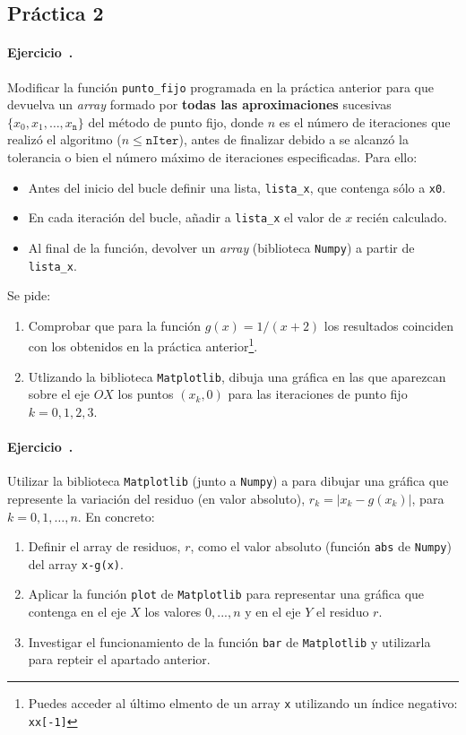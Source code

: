 \documentclass[11pt]{article}
\newcommand{\practica}[1]{\subsection*{#1}}
\newcounter{ejercicio}
\newcommand{\ejercicio}{\stepcounter{ejercicio}\paragraph*{Ejercicio~\theejercicio.}}
\begin{document}
\practica{Práctica 2}


\ejercicio
Modificar la función \verb|punto_fijo| programada en la práctica anterior para que devuelva un \textit{array} formado por \textbf{todas las aproximaciones} sucesivas $\{x_0,x_1,\dots,x_{\texttt{n}}\}$ del método de punto fijo, donde $n$ es el número de iteraciones que realizó el algoritmo ($n\le\texttt{nIter}$), antes de finalizar debido a se alcanzó la tolerancia o bien el número máximo de iteraciones especificadas. Para ello:
\begin{itemize}
  \item Antes del inicio del bucle definir una lista, \texttt{lista\_x}, que contenga sólo a \texttt{x0}.
  \item En cada iteración del bucle, añadir a \texttt{lista\_x} el valor de $x$ recién calculado.
  \item Al final de la función, devolver un \textit{array} (biblioteca \texttt{Numpy}) a partir de \texttt{lista\_x}.
\end{itemize}
Se pide:
\begin{enumerate}
  \item Comprobar que para la función $g(x)=1/(x+2)$ los resultados coinciden con los obtenidos en la práctica anterior\footnote{Puedes acceder al último elmento de un array \texttt{x} utilizando un índice negativo: \texttt{xx[-1]}}. 
  \item Utlizando la biblioteca \texttt{Matplotlib}, dibuja una gráfica en las que aparezcan sobre el eje $OX$ los puntos $(x_k, 0)$ para las iteraciones de punto fijo $k=0,1,2,3$.
\end{enumerate}

\ejercicio
Utilizar la biblioteca \texttt{Matplotlib} (junto a \texttt{Numpy}) a para dibujar una gráfica que represente la variación del residuo (en valor absoluto), $r_k = |x_k - g(x_k)|$, para $k=0,1,\dots,n$. En concreto: 
\begin{enumerate}
  \item Definir el array de residuos, $r$, como el valor absoluto (función \texttt{abs} de \texttt{Numpy}) del array \texttt{x-g(x)}.
  \item Aplicar la función \texttt{plot} de \texttt{Matplotlib} para representar una gráfica que contenga en el eje $X$ los valores $0,...,n$ y en el eje $Y$ el residuo $r$.
    \item Investigar el funcionamiento de la función \texttt{bar} de \texttt{Matplotlib} y utilizarla para repteir el apartado anterior.
\end{enumerate}
\end{document}
